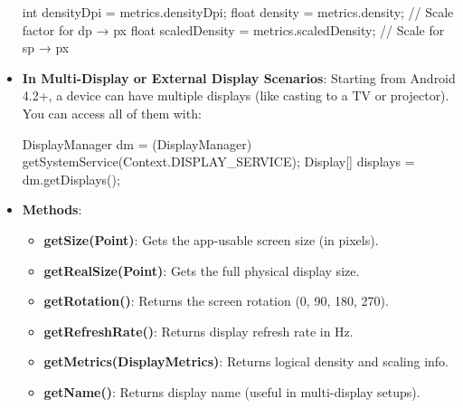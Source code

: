 \documentclass{report}
\begin{document}
\begin{itemize}
\begin{javacode}
                int densityDpi = metrics.densityDpi;
                float density = metrics.density;  // Scale factor for dp → px
                float scaledDensity = metrics.scaledDensity;  // Scale for sp → px
            \end{javacode}
        \item \textbf{In Multi-Display or External Display Scenarios}: Starting from Android 4.2+, a device can have multiple displays (like casting to a TV or projector). You can access all of them with:
            \bigbreak \noindent 
            \begin{javacode}
                DisplayManager dm = (DisplayManager) getSystemService(Context.DISPLAY_SERVICE);
                Display[] displays = dm.getDisplays();
            \end{javacode}
        \item \textbf{Methods}:
            \begin{itemize}
                \item \textbf{getSize(Point)}:	Gets the app-usable screen size (in pixels).
                \item \textbf{getRealSize(Point)}:	Gets the full physical display size.
                \item \textbf{getRotation()}:	Returns the screen rotation (0, 90, 180, 270).
                \item \textbf{getRefreshRate()}:	Returns display refresh rate in Hz.
                \item \textbf{getMetrics(DisplayMetrics)}:	Returns logical density and scaling info.
                \item \textbf{getName()}:	Returns display name (useful in multi-display setups).
            \end{itemize}
    \end{itemize}


\end{document}
